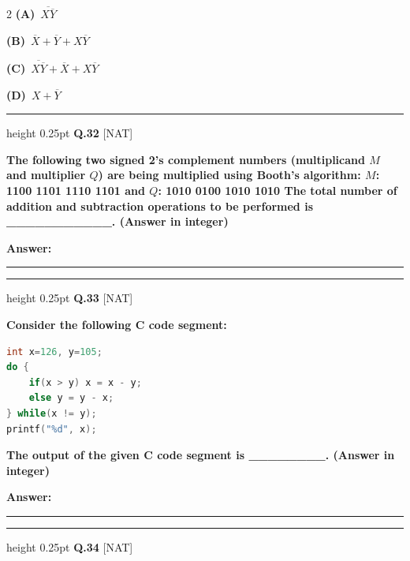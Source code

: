 \documentclass[a4paper,10pt,twoside]{article}
\begin{document}
\begin{multicols}{2}
\textbf{(A)}~$\overline{X \overline{Y}}$\par\vspace{2pt}\noindent
\textbf{(B)}~$\overline{X} + \overline{Y} + X\overline{Y}$\par\vspace{2pt}\noindent
\textbf{(C)}~$\overline{X \overline{Y}} + \overline{X} + X\overline{Y}$\par\vspace{2pt}\noindent
\textbf{(D)}~$X + \overline{Y}$
\par\vspace{6pt}\hrule height 0.25pt\vspace{6pt}
\noindent\textbf{Q.32} \hfill {\footnotesize\textsf{[NAT]}}
\par\vspace{2pt}
{\bfseries The following two signed 2's complement numbers (multiplicand $M$ and multiplier $Q$) are being multiplied using Booth's algorithm:
$M$: 1100 1101 1110 1101 and $Q$: 1010 0100 1010 1010
The total number of addition and subtraction operations to be performed is \_\_\_\_\_\_\_\_\_\_\_. (Answer in integer) \par}
\par\vspace{3pt}\noindent\textbf{Answer:} \rule{3.2cm}{0.4pt}
\par\vspace{6pt}\hrule height 0.25pt\vspace{6pt}
\noindent\textbf{Q.33} \hfill {\footnotesize\textsf{[NAT]}}
\par\vspace{2pt}
{\bfseries Consider the following C code segment:
 \par}\begin{lstlisting}[language=C, basicstyle=\scriptsize\ttfamily, frame=single, rulecolor=\color{black!40}, tabsize=2, breaklines=true, aboveskip=4pt, belowskip=4pt]
int x=126, y=105;
do {
    if(x > y) x = x - y;
    else y = y - x;
} while(x != y);
printf("%d", x);
\end{lstlisting}{\bfseries 
The output of the given C code segment is \_\_\_\_\_\_\_\_. (Answer in integer) \par}
\par\vspace{3pt}\noindent\textbf{Answer:} \rule{3.2cm}{0.4pt}
\par\vspace{6pt}\hrule height 0.25pt\vspace{6pt}
\noindent\textbf{Q.34} \hfill {\footnotesize\textsf{[NAT]}}

\end{multicols}
\end{document}
